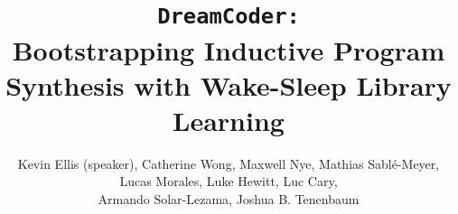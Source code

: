 \documentclass{beamer}
\title{\texttt{DreamCoder:}\\Bootstrapping Inductive Program Synthesis with Wake-Sleep Library Learning}
\author{Kevin Ellis (speaker), Catherine Wong, Maxwell Nye, Mathias Sabl\'e-Meyer,\\  Lucas Morales, Luke Hewitt, Luc Cary,\\Armando Solar-Lezama, Joshua B. Tenenbaum}
\institute{PLDI 2021}
\newcommand{\1}[1]{\mathds{1}\left[#1\right]}
\newcommand\Wider[2][3em]{%
\makebox[\linewidth][c]{%
  \begin{minipage}{\dimexpr\textwidth+#1\relax}
  \raggedright#2
  \end{minipage}%
  }%
}
\begin{document}
 
\frame{\titlepage}







\end{document}

